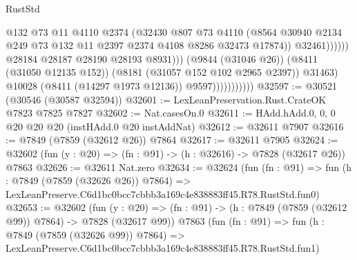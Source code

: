 \begin{lexlean}{RustStd}
\begin{coremodule}
                                              @132
                                              @73
                                              @11
                                              @4110
                                              @2374
                                              (@32430
                                                @807
                                                @73
                                                @4110
                                                (@8564
                                                  @30940
                                                  @2134
                                                  @249
                                                  @73
                                                  @132
                                                  @11
                                                  @2397
                                                  @2374
                                                  @4108
                                                  @8286
                                                  @32473
                                                  @17874))
                                              @32461))))))
                                  @28184
                                  @28187
                                  @28190
                                  @28193
                                  @8931)))
                            (@9844 (@31046 @26))
                            (@8411 (@31050 @12135 @152))
                            (@8181 (@31057 @152 @102 @2965 @2397))
                            @31463)
                          @10028
                          (@8411 (@14297 @1973 @12136))
                          @9597)))))))))))
@32597 := @30521 (@30546 (@30587 @32594))
@32601 := LexLeanPreservation.Rust.CrateOK @7823 @7825 @7827
@32602 := Nat.casesOn.{0}
@32611 := HAdd.hAdd.{0, 0, 0} @20 @20 @20 (instHAdd.{0} @20 instAddNat)
@32612 := @32611 @7907
@32616 := @7849 (@7859 (@32612 @26)) @7864
@32617 := @32611 @7905
@32624 := @32602 (fun (y : @20) => (fn : @91) -> (h : @32616) -> @7828 (@32617 @26)) @7863
@32626 := @32611 Nat.zero
@32634 := @32624
    (fun (fn : @91) =>
    fun (h : @7849 (@7859 (@32626 @26)) @7864) =>
    LexLeanPreserve.C6d1bc0bcc7cbbb3a169c4e838883ff45.R78.RustStd.fun0)
@32653 := @32602
    (fun (y : @20) => (fn : @91) -> (h : @7849 (@7859 (@32612 @99)) @7864) -> @7828 (@32617 @99))
    @7863
    (fun (fn : @91) =>
    fun (h : @7849 (@7859 (@32626 @99)) @7864) =>
    LexLeanPreserve.C6d1bc0bcc7cbbb3a169c4e838883ff45.R78.RustStd.fun1)

\end{coremodule}
\end{lexlean}
